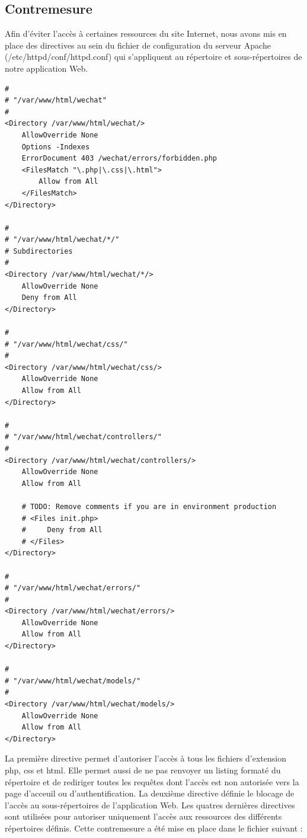 \documentclass[12pt]{article}
\begin{document}
\newpage
\subsection{Contremesure}\label{c5}

Afin d'éviter l'accès à certaines ressources du site Internet, nous avons mis en place des directives au sein du fichier de configuration du serveur Apache (/etc/httpd/conf/httpd.conf) qui s'appliquent au répertoire et sous-répertoires de notre application Web.

\begin{lstlisting}[style=JAVA]
#
# "/var/www/html/wechat"
#
<Directory /var/www/html/wechat/>
    AllowOverride None
    Options -Indexes
    ErrorDocument 403 /wechat/errors/forbidden.php
    <FilesMatch "\.php|\.css|\.html">
        Allow from All
    </FilesMatch>
</Directory>

#
# "/var/www/html/wechat/*/"
# Subdirectories
#
<Directory /var/www/html/wechat/*/>
    AllowOverride None
    Deny from All
</Directory>

#
# "/var/www/html/wechat/css/"
#
<Directory /var/www/html/wechat/css/>
    AllowOverride None
    Allow from All
</Directory>

#
# "/var/www/html/wechat/controllers/"
#
<Directory /var/www/html/wechat/controllers/>
    AllowOverride None
    Allow from All

    # TODO: Remove comments if you are in environment production
    # <Files init.php>
    #     Deny from All   
    # </Files>
</Directory>

#
# "/var/www/html/wechat/errors/"
#
<Directory /var/www/html/wechat/errors/>
    AllowOverride None
    Allow from All
</Directory>

#
# "/var/www/html/wechat/models/"
#
<Directory /var/www/html/wechat/models/>
    AllowOverride None
    Allow from All
</Directory>
\end{lstlisting}

La première directive permet d'autoriser l'accès à tous les fichiers d'extension php, css et html. Elle permet aussi de ne pas renvoyer un listing formaté du répertoire et de rediriger toutes les requêtes dont l'accès est non autorisée vers la page d'acceuil ou d'authentification. 
La deuxième directive définie le blocage de l'accès au sous-répertoires de l'application Web.
Les quatres dernières directives sont utilisées pour autoriser uniquement l'accès aux ressources des différents répertoires définis.
Cette contremesure a été mise en place dans le fichier suivant :
\end{document}
